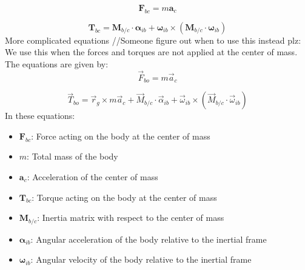 \begin{equation}
    \mathbf{F}_{bc} = m \mathbf{a}_c
\end{equation}

\begin{equation}
    \mathbf{T}_{bc} = \mathbf{M}_{b/c} \cdot \boldsymbol{\alpha}_{ib} + \boldsymbol{\omega}_{ib} \times \left( \mathbf{M}_{b/c} \cdot \boldsymbol{\omega}_{ib} \right)
\end{equation}
More complicated equations //Someone figure out when to use this instead plz:
We use this when the forces and torques are not applied at the center of mass. The equations are given by:
\begin{equation}
    \vec{F}_{bo} = m \vec{a}_c
\end{equation}
    
\begin{equation}
    \vec{T}_{bo} = \vec{r}_g \times m \vec{a}_c + \vec{M}_{b/c} \cdot \vec{\alpha}_{ib} + \vec{\omega}_{ib} \times \left( \vec{M}_{b/c} \cdot \vec{\omega}_{ib} \right)
\end{equation}    
In these equations:
\begin{itemize}
    \item $\mathbf{F}_{bc}$: Force acting on the body at the center of mass
    \item $m$: Total mass of the body
    \item $\mathbf{a}_c$: Acceleration of the center of mass
    \item $\mathbf{T}_{bc}$: Torque acting on the body at the center of mass
    \item $\mathbf{M}_{b/c}$: Inertia matrix with respect to the center of mass
    \item $\boldsymbol{\alpha}_{ib}$: Angular acceleration of the body relative to the inertial frame
    \item $\boldsymbol{\omega}_{ib}$: Angular velocity of the body relative to the inertial frame
\end{itemize}

